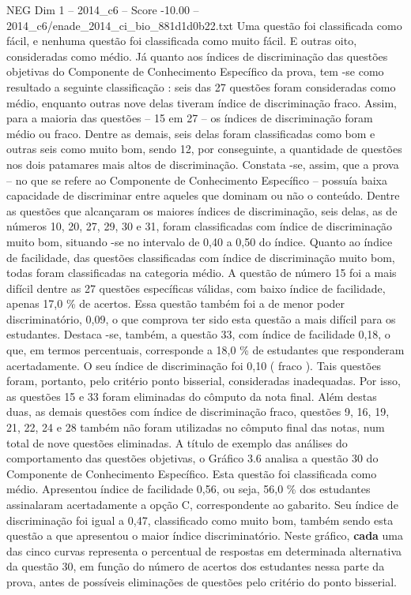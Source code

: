 \begin{textsample}{NEG Dim 1 – 2014\_c6 – Score -10.00 – 2014\_c6/enade\_2014\_ci\_bio\_881d1d0b22.txt}
Uma questão foi classificada como fácil, e nenhuma questão foi classificada como muito fácil.
E outras oito, consideradas como médio.
Já quanto aos índices de discriminação das questões objetivas do Componente de Conhecimento Específico da prova, tem -se como resultado a seguinte classificação : seis das 27 questões foram consideradas como médio, enquanto outras nove delas tiveram índice de discriminação fraco.
Assim, para a maioria das questões – 15 em 27 – os índices de discriminação foram médio ou fraco.
Dentre as demais, seis delas foram classificadas como bom e outras seis como muito bom, sendo 12, por conseguinte, a quantidade de questões nos dois patamares mais altos de discriminação.
Constata -se, assim, que a prova – no que se refere ao Componente de Conhecimento Específico – possuía baixa capacidade de discriminar entre aqueles que dominam ou não o conteúdo.
Dentre as questões que alcançaram os maiores índices de discriminação, seis delas, as de números 10, 20, 27, 29, 30 e 31, foram classificadas com índice de discriminação muito bom, situando -se no intervalo de 0,40 a 0,50 do índice.
Quanto ao índice de facilidade, das questões classificadas com índice de discriminação muito bom, todas foram classificadas na categoria médio.
A questão de número 15 foi a mais difícil dentre as 27 questões específicas válidas, com baixo índice de facilidade, apenas 17,0 \% de acertos.
Essa questão também foi a de menor poder discriminatório, 0,09, o que comprova ter sido esta questão a mais difícil para os estudantes.
Destaca -se, também, a questão 33, com índice de facilidade 0,18, o que, em termos percentuais, corresponde a 18,0 \% de estudantes que responderam acertadamente.
O seu índice de discriminação foi 0,10 ( fraco ).
Tais questões foram, portanto, pelo critério ponto bisserial, consideradas inadequadas.
Por isso, as questões 15 e 33 foram eliminadas do cômputo da nota final.
Além destas duas, as demais questões com índice de discriminação fraco, questões 9, 16, 19, 21, 22, 24 e 28 também não foram utilizadas no cômputo final das notas, num total de nove questões eliminadas.
A título de exemplo das análises do comportamento das questões objetivas, o Gráfico 3.6 analisa a questão 30 do Componente de Conhecimento Específico.
Esta questão foi classificada como médio.
Apresentou índice de facilidade 0,56, ou seja, 56,0 \% dos estudantes assinalaram acertadamente a opção C, correspondente ao gabarito.
Seu índice de discriminação foi igual a 0,47, classificado como muito bom, também sendo esta questão a que apresentou o maior índice discriminatório.
Neste gráfico, \textbf{cada} uma das cinco curvas representa o percentual de respostas em determinada alternativa da questão 30, em função do número de acertos dos estudantes nessa parte da prova, antes de possíveis eliminações de questões pelo critério do ponto bisserial.

\end{textsample}
